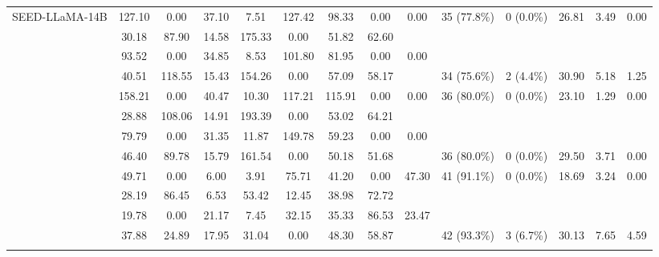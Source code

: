 \documentclass[letterpaper]{article} %
\begin{document}
{\begin{table*}[t!]
\begin{tabular}{p{2cm} cccccccc cc ccc}
\multirow{2}{*}{SEED-LLaMA-14B} & 127.10 & 0.00 & 37.10 & 7.51 & 127.42 & 98.33 & 0.00 & 0.00 & \multirow{2}{*}{35 (77.8\%)} & \multirow{2}{*}{0 (0.0\%)} & \multirow{2}{*}{26.81} & \multirow{2}{*}{3.49} & \multirow{2}{*}{0.00} \\
&30.18 & 87.90 & 14.58 & 175.33 & 0.00 & 51.82 & 62.60 &  &  &  &  & & \\
\addlinespace[4pt]
\rowcolor{bg-tb-light-vision} & 93.52 & 0.00 & 34.85 & 8.53 & 101.80 & 81.95 & 0.00 & 0.00 &  &  &  &  &  \\
\rowcolor{bg-tb-light-vision} \multirow{-2}{*}{Emu2-32B}  &  40.51 & 118.55 & 15.43 & 154.26 & 0.00 & 57.09 & 58.17 &   & \multirow{-2}{*}{34 (75.6\%)} & \multirow{-2}{*}{2 (4.4\%)} & \multirow{-2}{*}{30.90 } & \multirow{-2}{*}{ 5.18} & \multirow{-2}{*}{1.25 } \\
\addlinespace[4pt]
\multirow{2}{*}{AnyGPT} &  158.21 & 0.00 & 40.47 & 10.30 & 117.21 & 115.91 & 0.00 & 0.00 & \multirow{2}{*}{36 (80.0\%)} & \multirow{2}{*}{0 (0.0\%)} & \multirow{2}{*}{23.10} & \multirow{2}{*}{1.29} & \multirow{2}{*}{0.00} \\
& 28.88 & 108.06 & 14.91 & 193.39 & 0.00 & 53.02 & 64.21 &  &  &  &  & & \\
\addlinespace[4pt]
\rowcolor{bg-tb-light-vision} &79.79 & 0.00 & 31.35 & 11.87 & 149.78 & 59.23 & 0.00 & 0.00 &  &  &  &  &  \\
\rowcolor{bg-tb-light-vision} \multirow{-2}{*}{LaVIT-V2 (7B)}& 46.40 & 89.78 & 15.79 & 161.54 & 0.00 & 50.18 & 51.68 & &  \multirow{-2}{*}{36 (80.0\%)} & \multirow{-2}{*}{0 (0.0\%)} & \multirow{-2}{*}{29.50} & \multirow{-2}{*}{3.71 } & \multirow{-2}{*}{0.00 } \\
\addlinespace[4pt]
\multirow{2}{*}{NExT-GPT-V1.5} & 49.71 & 0.00 & 6.00 & 3.91 & 75.71 & 41.20 & 0.00 & 47.30 &  \multirow{2}{*}{41 (91.1\%)} & \multirow{2}{*}{0 (0.0\%)} & \multirow{2}{*}{18.69} & \multirow{2}{*}{3.24} & \multirow{2}{*}{0.00} \\
 & 28.19 & 86.45 & 6.53 & 53.42 & 12.45 & 38.98 & 72.72  &  &  &  &  & & \\
\addlinespace[4pt]
\rowcolor{bg-tb-light-vision}  & 19.78 & 0.00 & 21.17 & 7.45 & 32.15 & 35.33 & 86.53 & 23.47 &  &  &  &  &  \\
\rowcolor{bg-tb-light-vision} \multirow{-2}{*}{Vitron-V1} &  37.88 & 24.89 & 17.95 & 31.04 & 0.00 & 48.30 & 58.87 & &  \multirow{-2}{*}{42 (93.3\%)} & \multirow{-2}{*}{3 (6.7\%)} & \multirow{-2}{*}{30.13 } & \multirow{-2}{*}{7.65 } & \multirow{-2}{*}{4.59 } \\
\addlinespace[4pt]

 \bottomrule
\end{tabular}%
\end{table*}
}
\end{document}
